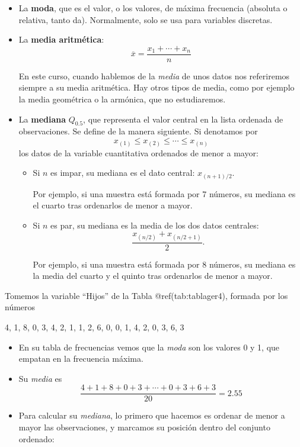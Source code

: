 \documentclass[
  spanish,
  letterpaper,
  DIV=11,
  numbers=noendperiod]{scrreprt}
\begin{document}
\begin{itemize}
\item
  La \textbf{moda}, que es el valor, o los valores, de máxima frecuencia
  (absoluta o relativa, tanto da). Normalmente, solo se usa para
  variables discretas.
\item
  La \textbf{media aritmética}: \[
   \overline{x}=\frac{x_1+\cdots+x_n}{n}
  \]

  En este curso, cuando hablemos de la \emph{media} de unos datos nos
  referiremos siempre a su media aritmética. Hay otros tipos de media,
  como por ejemplo la media geométrica o la armónica, que no
  estudiaremos.
\item
  La \textbf{mediana} \(Q_{0.5}\), que representa el valor central en la
  lista ordenada de observaciones. Se define de la manera siguiente. Si
  denotamos por \[
  x_{(1)}\leqslant x_{(2)}\leqslant \cdots \leqslant x_{(n)}
  \] los datos de la variable cuantitativa ordenados de menor a mayor:

  \begin{itemize}
  \item
    Si \(n\) es impar, su mediana es el dato central: \(x_{(n+1)/2}\).

    Por ejemplo, si una muestra está formada por 7 números, su mediana
    es el cuarto tras ordenarlos de menor a mayor.
  \item
    Si \(n\) es par, su mediana es la media de los dos datos centrales:
    \[
    \frac{x_{(n/2)}+x_{(n/2+1)}}{2}.
    \]

    Por ejemplo, si una muestra está formada por 8 números, su mediana
    es la media del cuarto y el quinto tras ordenarlos de menor a mayor.
  \end{itemize}
\end{itemize}

Tomemos la variable ``Hijos'' de la Tabla @ref(tab:tablager4), formada
por los números

4, 1, 8, 0, 3, 4, 2, 1, 1, 2, 6, 0, 0, 1, 4, 2, 0, 3, 6, 3

\begin{itemize}
\item
  En su tabla de frecuencias vemos que la \emph{moda} son los valores 0
  y 1, que empatan en la frecuencia máxima.
\item
  Su \emph{media} es \[
  \frac{4+1+8+0+3+\cdots+0+3+6+3}{20}=2.55
  \]
\item
  Para calcular su \emph{mediana}, lo primero que hacemos es ordenar de
  menor a mayor las observaciones, y marcamos su posición dentro del
  conjunto ordenado:
\end{itemize}
\end{document}
